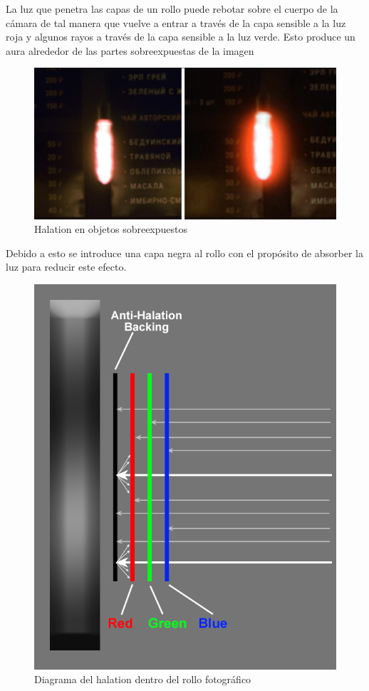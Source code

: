 \documentclass{article}
\begin{document}
La luz que penetra las capas de un rollo puede rebotar sobre el cuerpo de la cámara de tal manera que vuelve a entrar a través de la capa sensible a la luz roja y algunos rayos a través de la capa sensible a la luz verde. Esto produce un aura alrededor de las partes sobreexpuestas de la imagen

\begin{figure}[H]
	\centering
	\includegraphics[width=0.75\linewidth]{Figuras/Halation_2}
	\caption{Halation en objetos sobreexpuestos}
	\label{fig:halation2}
\end{figure}

Debido a esto se introduce una capa negra al rollo con el propósito de absorber la luz para reducir este efecto.

\begin{figure}[H]
	\centering
	\includegraphics[width=0.60\linewidth]{Figuras/Halation}
	\caption{Diagrama del halation dentro del rollo fotográfico}
	\label{fig:halation}
\end{figure}




	
\end{document}
